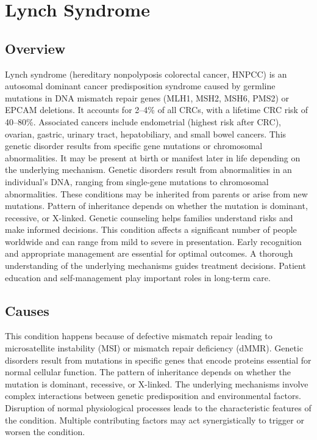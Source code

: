 \chapter{Lynch Syndrome}
\label{sec:Lynch Syndrome}

\section{Overview}
Lynch syndrome (hereditary nonpolyposis colorectal cancer, HNPCC) is an autosomal dominant cancer predisposition syndrome caused by germline mutations in DNA mismatch repair genes (MLH1, MSH2, MSH6, PMS2) or EPCAM deletions. It accounts for 2--4\% of all CRCs, with a lifetime CRC risk of 40--80\%. Associated cancers include endometrial (highest risk after CRC), ovarian, gastric, urinary tract, hepatobiliary, and small bowel cancers. This genetic disorder results from specific gene mutations or chromosomal abnormalities. It may be present at birth or manifest later in life depending on the underlying mechanism. Genetic disorders result from abnormalities in an individual's DNA, ranging from single-gene mutations to chromosomal abnormalities. These conditions may be inherited from parents or arise from new mutations. Pattern of inheritance depends on whether the mutation is dominant, recessive, or X-linked. Genetic counseling helps families understand risks and make informed decisions. This condition affects a significant number of people worldwide and can range from mild to severe in presentation. Early recognition and appropriate management are essential for optimal outcomes. A thorough understanding of the underlying mechanisms guides treatment decisions. Patient education and self-management play important roles in long-term care.
\section{Causes}
This condition happens because of defective mismatch repair leading to microsatellite instability (MSI) or mismatch repair deficiency (dMMR). Genetic disorders result from mutations in specific genes that encode proteins essential for normal cellular function. The pattern of inheritance depends on whether the mutation is dominant, recessive, or X-linked. The underlying mechanisms involve complex interactions between genetic predisposition and environmental factors. Disruption of normal physiological processes leads to the characteristic features of the condition. Multiple contributing factors may act synergistically to trigger or worsen the condition.
